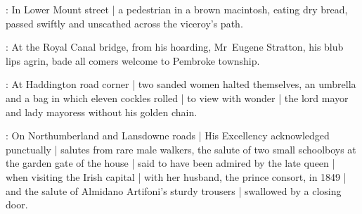 :
In Lower Mount street |
a pedestrian in a brown macintosh,
eating dry bread,
passed swiftly and unscathed across the viceroy's path.

:
At the Royal Canal bridge,
from his hoarding,
Mr~Eugene Stratton,
his blub lips agrin,
bade all comers welcome to Pembroke township.

:
At Haddington road corner |
two sanded women halted themselves,
an umbrella and a bag in which eleven cockles rolled |
to view with wonder |
the lord mayor and lady mayoress without his golden chain.

:
On Northumberland and Lansdowne roads |
His Excellency acknowledged punctually |
salutes from rare male walkers,
the salute of two small schoolboys
at the garden gate of the house |
said to have been admired by the late queen |
when visiting the Irish capital |
with her husband, the prince consort, in 1849 |
and the salute of Almidano Artifoni's sturdy trousers |
swallowed by a closing door.
